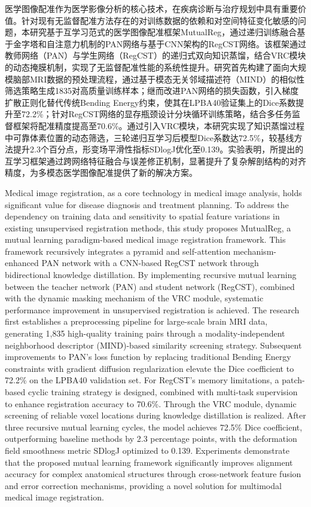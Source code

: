 \begin{cabstract}

  医学图像配准作为医学影像分析的核心技术，在疾病诊断与治疗规划中具有重要价值。针对现有无监督配准方法存在的对训练数据的依赖和对空间特征变化敏感的问题，本研究基于互学习范式的医学图像配准框架MutualReg，通过递归训练融合基于金字塔和自注意力机制的PAN网络与基于CNN架构的RegCST网络。该框架通过教师网络（PAN）与学生网络（RegCST）的递归式双向知识蒸馏，结合VRC模块的动态掩膜机制，实现了无监督配准性能的系统性提升。研究首先构建了面向大规模脑部MRI数据的预处理流程，通过基于模态无关邻域描述符（MIND）的相似性筛选策略生成1835对高质量训练样本；继而改进PAN网络的损失函数，引入梯度扩散正则化替代传统Bending Energy约束，使其在LPBA40验证集上的Dice系数提升至72.2\%；针对RegCST网络的显存瓶颈设计分块循环训练策略，结合多任务监督框架将配准精度提高至70.6\%。通过引入VRC模块，本研究实现了知识蒸馏过程中可靠体素位置的动态筛选，三轮递归互学习后模型Dice系数达72.5\%，较基线方法提升2.3个百分点，形变场平滑性指标SDlogJ优化至0.139。实验表明，所提出的互学习框架通过跨网络特征融合与误差修正机制，显著提升了复杂解剖结构的对齐精度，为多模态医学图像配准提供了新的解决方案。
\end{cabstract}

\begin{eabstract}
  Medical image registration, as a core technology in medical image analysis, holds significant value for disease diagnosis and treatment planning. To address the dependency on training data and sensitivity to spatial feature variations in existing unsupervised registration methods, this study proposes MutualReg, a mutual learning paradigm-based medical image registration framework. This framework recursively integrates a pyramid and self-attention mechanism-enhanced PAN network with a CNN-based RegCST network through bidirectional knowledge distillation. By implementing recursive mutual learning between the teacher network (PAN) and student network (RegCST), combined with the dynamic masking mechanism of the VRC module, systematic performance improvement in unsupervised registration is achieved. The research first establishes a preprocessing pipeline for large-scale brain MRI data, generating 1,835 high-quality training pairs through a modality-independent neighborhood descriptor (MIND)-based similarity screening strategy. Subsequent improvements to PAN's loss function by replacing traditional Bending Energy constraints with gradient diffusion regularization elevate the Dice coefficient to 72.2\% on the LPBA40 validation set. For RegCST's memory limitations, a patch-based cyclic training strategy is designed, combined with multi-task supervision to enhance registration accuracy to 70.6\%. Through the VRC module, dynamic screening of reliable voxel locations during knowledge distillation is realized. After three recursive mutual learning cycles, the model achieves 72.5\% Dice coefficient, outperforming baseline methods by 2.3 percentage points, with the deformation field smoothness metric SDlogJ optimized to 0.139. Experiments demonstrate that the proposed mutual learning framework significantly improves alignment accuracy for complex anatomical structures through cross-network feature fusion and error correction mechanisms, providing a novel solution for multimodal medical image registration.
\end{eabstract}
